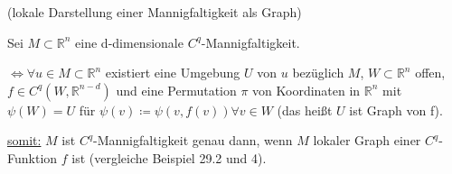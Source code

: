 \begin{sa}

(lokale Darstellung einer Mannigfaltigkeit als Graph)

Sei $M \subset  \mathbb{R}^{n}$ eine d-dimensionale $C^{q}$-Mannigfaltigkeit.

$\Longleftrightarrow \forall u \in M \subset \mathbb{R}^n $ existiert eine Umgebung
$U$ von $u$  bezüglich $M$, $W \subset \mathbb{R}^n $ offen, 
$f \in C^q (W, \mathbb{R}^{n-d})$ und eine Permutation $\pi$ von Koordinaten in
$\mathbb{R}^n $ mit $ \psi (W) = U $ für $ \psi (v) \coloneqq \psi (v, f(v)) 
\forall v \in W $ (das heißt $U$ ist Graph von f).

\underline{somit:} $M$ ist $C^q$-Mannigfaltigkeit genau dann, wenn $M$ lokaler Graph
einer $C^q$-Funktion $f$ ist (vergleiche Beispiel 29.2 und 4).

\end{sa}

